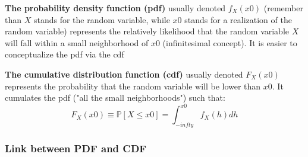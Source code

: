 \documentclass{beamer}
\newenvironment{wideitemize}{\itemize\addtolength{\itemsep}{10pt}}{\enditemize}
\begin{document}
\begin{frame}
  \begin{wideitemize}
  \item \textbf{The probability density function (pdf)} usually denoted $f_X(x0)$ (remember than $X$ stands for the random variable, while $x0$ stands for a realization of the random variable) represents the relatively likelihood that the random variable $X$ will fall within a small neighborhood of $x0$ (infinitesimal concept). It is easier to conceptualize the pdf via the cdf
  \item \textbf{The cumulative distribution function (cdf)} usually denoted $F_X(x0)$ represents the probability that the random variable will be lower than $x0$. It cumulates the pdf ("all the small neighborhoods") such that:
    \begin{equation*}
F_X(x0) \equiv \mathbb{P}[X \leq x0] = \int_{-infty}^{x0} f_X(h) dh      
    \end{equation*}    
  \end{wideitemize}  
\end{frame}


\begin{frame}
\frametitle{Link between PDF and CDF}
\end{frame}
\end{document}
